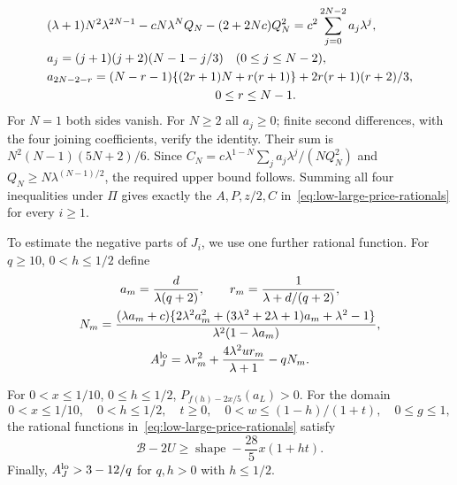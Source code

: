 \begin{align*}
 &(\lambda+1)N^2\lambda^{2N-1}-cN\lambda^NQ_N-(2+2Nc)Q_N^2
       =c^2\sum_{j=0}^{2N-2}a_j\lambda^j,\\
 &a_j=(j+1)(j+2)(N-1-j/3)\quad(0\le j\le N-2),\\
 &a_{2N-2-r}=(N-r-1)\{(2r+1)N+r(r+1)\}+2r(r+1)(r+2)/3,\\
 &\hspace{48mm}0\le r\le N-1.
\end{align*}
For $N=1$ both sides vanish.  For $N\ge2$ all $a_j\ge0$;
finite second differences, with the four joining coefficients,
verify the identity.  Their sum is
$N^2(N-1)(5N+2)/6$.  Since
$C_N=c\lambda^{1-N}\sum_j a_j\lambda^j/(NQ_N^2)$ and
$Q_N\ge N\lambda^{(N-1)/2}$, the required upper bound follows.
Summing all four inequalities under $\Pi$ gives exactly the
$A,P,z/2,C$ in~\eqref{eq:low-large-price-rationals} for every $i\ge1$.

To estimate the negative parts of $J_i$, we use one further rational function. For
$q\ge10$, $0<h\le1/2$ define
\begin{equation}\label{eq:low-AJ-rational}
 \begin{gathered}
 a_m=\frac{d}{\lambda(q+2)},\qquad
 r_m=\frac1{\lambda+d/(q+2)},\\
 N_m=\frac{(\lambda a_m+c)
       \{2\lambda^2a_m^2+(3\lambda^2+2\lambda+1)a_m+\lambda^2-1\}}
                 {\lambda^2(1-\lambda a_m)},\\
 A_J^{\rm lo}=\lambda r_m^2+
                   \frac{4\lambda^2u r_m}{\lambda+1}-qN_m.
 \end{gathered}
\end{equation}

\begin{lemma}
\label{lem:low-Q3-arithmetic}
For $0<x\le1/10$, $0\le h\le1/2$,
$P_{f(h)-2x/5}(a_L)>0$.
For the domain
\[
 0<x\le1/10,\quad0<h\le1/2,\quad t\ge0,\quad
 0<w\le(1-h)/(1+t),\quad0\le g\le1,
\]
the rational functions in~\eqref{eq:low-large-price-rationals} satisfy
\begin{equation}\label{eq:low-Q3-price-check}
 \mathcal B-2U\ge\operatorname{shape}-\frac{28}{5}x(1+ht).
\end{equation}
Finally, $A_J^{\rm lo}>3-12/q$ for $q,h>0$ with $h\le1/2$.
\end{lemma}

